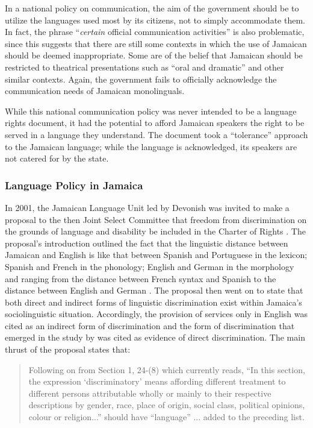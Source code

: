 \documentclass[output=paper,colorlinks,citecolor=brown]{langscibook}
\begin{document}
In a national policy on communication, the aim of the government should be to utilize the languages used most by its citizens, not to simply accommodate them. In fact, the phrase “\emph{certain} official communication activities” is also problematic, since this suggests that there are still some contexts in which the use of Jamaican should be deemed inappropriate. Some are of the belief that Jamaican should be restricted to theatrical presentations such as “oral and dramatic” and other similar contexts. Again, the government fails to officially acknowledge the communication needs of Jamaican monolinguals. 

While this national communication policy was never intended to be a language rights document, it had the potential to afford Jamaican speakers the right to be served in a language they understand. The document took a “tolerance” approach to the Jamaican language; while the language is acknowledged, its speakers are not catered for by the state. 


\subsubsection{Language Policy in Jamaica}

In 2001, the Jamaican Language Unit led by Devonish was invited to make a proposal to the then Joint Select Committee that freedom from discrimination on the grounds of language and disability be included in the Charter of Rights \citep{Devonish2001}. The proposal’s introduction outlined the fact that the linguistic distance between Jamaican and English is like that between Spanish and Portuguese in the lexicon; Spanish and French in the phonology; English and German in the morphology and ranging from the distance between French syntax and Spanish to the distance between English and German \citep{Devonish2001}. The proposal then went on to state that both direct and indirect forms of linguistic discrimination exist within Jamaica’s sociolinguistic situation. Accordingly, the provision of services only in English was cited as an indirect form of discrimination and the form of discrimination that emerged in the study by \citet[3]{Linton-PhilpFrench2001} was cited as evidence of direct discrimination. The main thrust of the proposal states that:

\begin{quote}
Following on from Section 1, 24-(8) which currently reads, “In this section, the expression `discriminatory' means affording different treatment to different persons attributable wholly or mainly to their respective descriptions by gender, race, place of origin, social class, political opinions, colour or religion...” should have “language” ... added to the preceding list.   
\end{quote}
 
\end{document}
